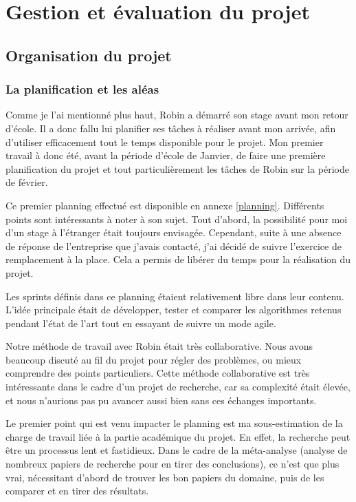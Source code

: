 \documentclass[openany, 11pt]{memoir}
\begin{document}
\newpage
\chapter{Gestion et évaluation du projet}

\section{Organisation du projet}

\subsection{La planification et les aléas}

Comme je l'ai mentionné plus haut, Robin a démarré son stage avant mon retour d'école. Il a donc fallu lui planifier ses tâches à réaliser avant mon arrivée, afin d'utiliser efficacement tout le temps disponible pour le projet. Mon premier travail à donc été, avant la période d'école de Janvier, de faire une première planification du projet et tout particulièrement les tâches de Robin sur la période de février.

Ce premier planning effectué est disponible en annexe \ref{planning}. Différents points sont intéressants à noter à son sujet. Tout d'abord, la possibilité pour moi d'un stage à l'étranger était toujours envisagée. Cependant, suite à une absence de réponse de l'entreprise que j'avais contacté, j'ai décidé de suivre l'exercice de remplacement à la place. Cela a permis de libérer du temps pour la réalisation du projet.

Les sprints définis dans ce planning étaient relativement libre dans leur contenu. L'idée principale était de développer, tester et comparer les algorithmes retenus pendant l'état de l'art tout en essayant de suivre un mode agile.

\bigskip
Notre méthode de travail avec Robin était très collaborative. Nous avons beaucoup discuté au fil du projet pour régler des problèmes, ou mieux comprendre des points particuliers. Cette méthode collaborative est très intéressante dans le cadre d'un projet de recherche, car sa complexité était élevée, et nous n'aurions pas pu avancer aussi bien sans ces échanges importants.

\bigskip
Le premier point qui est venu impacter le planning est ma sous-estimation de la charge de travail liée à la partie académique du projet. En effet, la recherche peut être un processus lent et fastidieux. Dans le cadre de la méta-analyse (analyse de nombreux papiers de recherche pour en tirer des conclusions), ce n'est que plus vrai, nécessitant d'abord de trouver les bon papiers du domaine, puis de les comparer et en tirer des résultats.
\end{document}
